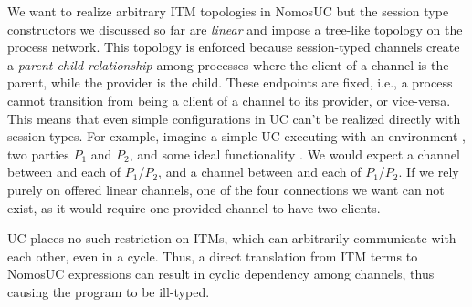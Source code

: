 


We want to realize arbitrary ITM topologies in NomosUC but the session type constructors we discussed so far are \emph{linear} and impose a tree-like topology
on the process network.
This topology is enforced because session-typed channels create a \emph{parent-child relationship} among processes
where the client of a channel is the parent, while the provider is the child.
These endpoints are fixed, i.e., a process cannot transition from being a client of
a channel to its provider, or vice-versa.
This means that even simple configurations in UC can't be realized directly with session types.
For example, imagine a simple UC executing with an environment \Z, two parties $P_1$ and $P_2$, and some ideal functionality \F.
We would expect a channel between \Z and each of $P_1$/$P_2$, and a channel between \F and each of $P_1$/$P_2$. 
If we rely purely on offered linear channels, one of the four connections we want can not exist, as it would require one provided channel to have two clients. 

UC places no such restriction on ITMs, which can arbitrarily communicate with each other, even in a cycle.
Thus, a direct translation from ITM terms to NomosUC expressions can result in cyclic
dependency among channels, thus causing the program to be ill-typed.

